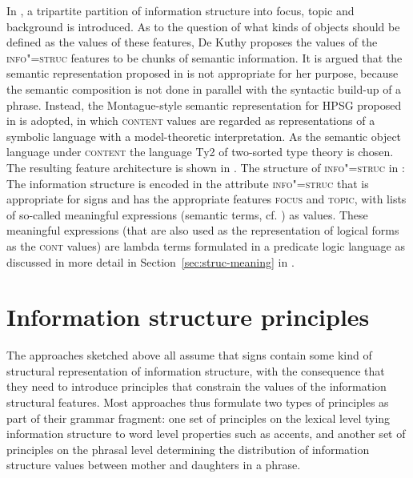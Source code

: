 \documentclass[output=paper
 	        ,biblatex
                ,babelshorthands
                ,newtxmath
                ,draftmode
                ,colorlinks, citecolor=brown
]{langscibook}
\begin{document}
In \cite{deKuthy2002a}, a tripartite partition of information
structure into focus, topic and background is introduced. As to the
question of what kinds of objects should be defined as the values of
these features, De Kuthy proposes the values of the
\textsc{info"=struc} features to be chunks of semantic information.  It
is argued that the semantic representation proposed in \cite{ps2} is
not appropriate for her purpose, because the semantic composition is
not done in parallel with the syntactic build-up of a phrase. Instead,
the Montague-style \citep[cf.\ ][]{DWP81a-u} semantic representation for HPSG proposed in
\cite{Sailer2000a} is adopted, in which \textsc{content} values are
regarded as representations of a symbolic language with a
model-theoretic interpretation. As the semantic object language under
\textsc{content} the language Ty2 \citep[cf.\ ][]{Gallin75a-u} of
two-sorted type theory is chosen. The resulting feature architecture
is shown in .
\ea
The structure of \textsc{info"=struc} in \cite[165]{deKuthy2002a}:\\
\leavevmode
{}
    \label{fig:info-struc}
\z
The information structure is encoded in the attribute
\textsc{info"=struc} that is appropriate for signs and has the
appropriate features \textsc{focus} and \textsc{topic}, with lists of
so-called meaningful expressions (semantic terms, cf.
\citealt{Sailer2000a}) as values. These meaningful expressions (that are
also used as the representation of logical forms as the \textsc{cont}
values) are lambda terms formulated in a predicate logic language as
discussed in more detail in Section~\ref{sec:struc-meaning} in 
.

\section{Information structure principles}
\label{sec:inf-principles}

The approaches sketched above all assume that signs contain some kind
of structural representation of information structure, with the
consequence that they need to introduce principles that constrain the
values of the information structural features. Most approaches thus
formulate two types of principles as part of their grammar fragment:
one set of principles on the lexical level tying information structure to word
level properties such as accents, and another set of principles on the
phrasal level determining the distribution of information structure
values between mother and daughters in a phrase.
\end{document}
